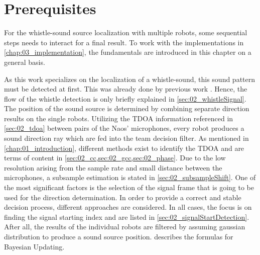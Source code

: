 \chapter{Prerequisites}
\label{chap:02_prerequisites}

For the whistle-sound source localization with multiple robots, some
sequential steps needs to interact for a final result.
To work with the implementations in \cref{chap:03_implementation}, the fundamentals
are introduced in this chapter on a general basis.

As this work specializes on the localization of a whistle-sound, this sound pattern
must be detected at first.
This was already done by previous work \cite{Hasselbring}.
Hence, the flow of the whistle detection is only briefly explained in \cref{sec:02_whistleSignal}.
The position of the sound source is determined by combining
separate direction results on the single robots.
Utilizing the \ac{TDOA} information referenced in \cref{sec:02_tdoa} between pairs
of the Naos' microphones, every robot produces a sound direction ray which
are fed into the team decision filter.
As mentioned in \cref{chap:01_introduction}, different methods exist to identify the \ac{TDOA}
and are terms of content in \cref{sec:02_cc,sec:02_gcc,sec:02_phase}.
Due to the low resolution arising from the sample rate and small distance between the microphones,
a subsample estimation is stated in \cref{sec:02_subsampleShift}.
One of the most significant factors is the selection of the signal frame that is going to
be used for the direction determination.
In order to provide a correct and stable decision process, different approaches
are considered.
In all cases, the focus is on finding the signal starting index
and are listed in \cref{sec:02_signalStartDetection}.
After all, the results of the individual robots are filtered by assuming
gaussian distribution to produce a sound source position.
 describes the formulas for Bayesian Updating.









% 

